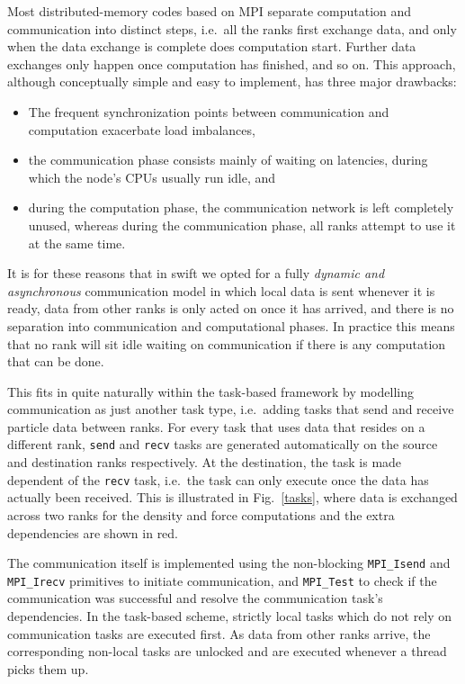 \documentclass{sig-alternate-05-2015}
\newcommand{\swift}{{\sc swift}\xspace}
\begin{document}
Most distributed-memory codes based on MPI \cite{ref:Snir1998}
separate computation and communication into distinct steps, i.e.~all
the ranks first exchange data, and only when the data exchange is
complete does computation start. Further data exchanges only happen
once computation has finished, and so on.
This approach, although conceptually simple and easy to implement,
has three major drawbacks:
\begin{itemize}
  \item The frequent synchronization points between communication
    and computation exacerbate load imbalances,
  \item the communication phase consists mainly of waiting on
    latencies, during which the node's CPUs usually run idle, and
  \item during the computation phase, the communication network
    is left completely unused, whereas during the communication
    phase, all ranks attempt to use it at the same time.
\end{itemize}

It is for these reasons that in \swift we opted for a fully
{\em dynamic and asynchronous} communication model in which local
data is sent whenever it is ready, data from other ranks is
only acted on once it has arrived, and there is no separation into
communication and computational phases.
In practice this means that no rank will sit idle waiting on
communication if there is any computation that can be done.

This fits in quite naturally within the task-based framework
by modelling communication as just another task type, i.e.~adding
tasks that send and receive particle data between ranks.
For every task that uses data that resides on a different rank,
{\tt send} and {\tt recv} tasks are generated automatically on the source
and destination ranks respectively.
At the destination, the task is made dependent of the {\tt recv}
task, i.e.~the task can only execute once the data has actually
been received.
This is illustrated in Fig.~\ref{tasks}, where data is exchanged across
two ranks for the density and force computations and the extra
dependencies are shown in red.

The communication itself is implemented using the non-blocking
{\tt MPI\_Isend} and {\tt MPI\_Irecv} primitives to initiate
communication, and {\tt MPI\_Test} to check if the communication was
successful and resolve the communication task's dependencies.  In the
task-based scheme, strictly local tasks which do not rely on
communication tasks are executed first.  As data from other ranks
arrive, the corresponding non-local tasks are unlocked and are
executed whenever a thread picks them up.
\end{document}
